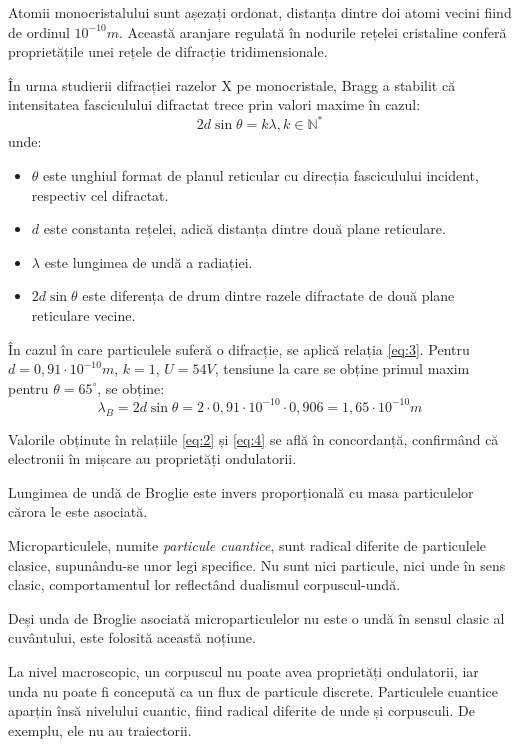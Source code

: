 Atomii monocristalului sunt așezați ordonat, distanța dintre doi atomi vecini
fiind de ordinul \( 10^{-10} \unit{m} \). Această aranjare regulată în nodurile
rețelei cristaline conferă proprietățile unei rețele de difracție
tridimensionale.

În urma studierii difracției razelor X pe monocristale, Bragg a stabilit că
intensitatea fasciculului difractat trece prin valori maxime în cazul:
\begin{equation}
    2d\sin\theta = k\lambda, k \in \mathbb{N^*} \label{eq:3}
\end{equation}
unde:
\begin{itemize}
    \item $\theta$ este unghiul format de planul reticular cu direcția fasciculului incident, respectiv cel difractat.
    \item $d$ este constanta rețelei, adică distanța dintre două plane reticulare.
    \item $\lambda$ este lungimea de undă a radiației.
    \item $2d\sin\theta$ este diferența de drum dintre razele difractate de două plane reticulare vecine.
\end{itemize}

În cazul în care particulele suferă o difracție, se aplică relația
\eqref{eq:3}. Pentru \( d = 0,91 \cdot 10^{-10} \unit{m} \), $k = 1$,
$U = 54 \unit{V}$, tensiune la care se obține primul maxim pentru
$\theta = 65^\circ$, se obține:
\begin{equation}
    \lambda_B = 2d\sin\theta = 2 \cdot 0,91 \cdot 10^{-10} \cdot 0,906 = 1,65 \cdot 10^{-10} \unit{m} \label{eq:4}
\end{equation}

Valorile obținute în relațiile \eqref{eq:2} și \eqref{eq:4} se află în concordanță, confirmând că
electronii în mișcare au proprietăți ondulatorii.

Lungimea de undă de Broglie este invers proporțională cu masa particulelor cărora le este asociată.

Microparticulele, numite \emph{particule cuantice}, sunt radical diferite de
particulele clasice, supunându-se unor legi specifice. Nu sunt nici particule,
nici unde în sens clasic, comportamentul lor reflectând dualismul
corpuscul-undă.

Deși unda de Broglie asociată microparticulelor nu este o undă în sensul clasic
al cuvântului, este folosită această noțiune.

La nivel macroscopic, un corpuscul nu poate avea proprietăți ondulatorii, iar
unda nu poate fi concepută ca un flux de particule discrete. Particulele
cuantice aparțin însă nivelului cuantic, fiind radical diferite de unde și
corpusculi. De exemplu, ele nu au traiectorii.

